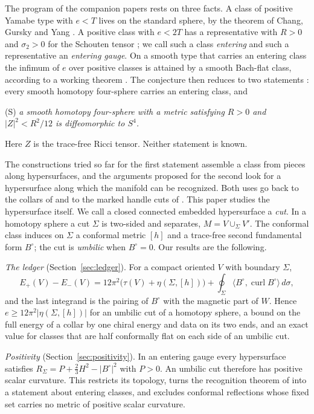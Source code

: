 \documentclass[11pt,letterpaper]{article}
\numberwithin{equation}{section}
\theoremstyle{definition}
\DeclareMathOperator{\curl}{curl}
\begin{document}
The program of the companion papers \cite{Baker2026ChiralMaster} rests on
three facts. A class of positive Yamabe type with \(e<T\) lives on the
standard sphere, by the theorem of Chang, Gursky and Yang
\cite{ChangGurskyYang2003}. A positive class with \(e<2T\) has a
representative with \(R>0\) and \(\sigma_2>0\) for the Schouten tensor
\cite{ChangGurskyYang2002PositiveRicci}; we call such a class
\emph{entering} and such a representative an \emph{entering gauge}. On a
smooth type that carries an entering class the infimum of \(e\) over
positive classes is attained by a smooth Bach-flat class, according to a
working theorem \cite{Baker2026BourAttainment}. The conjecture then
reduces to two statements \cite{Baker2026ChiralMaster}: every smooth
homotopy four-sphere carries an entering class, and

\medskip
\noindent\textup{(S)}\quad
\emph{a smooth homotopy four-sphere with a metric satisfying \(R>0\) and
\(|Z|^2<R^2/12\) is diffeomorphic to \(S^4\).}
\medskip

\noindent
Here \(Z\) is the trace-free Ricci tensor. Neither statement is known.

The constructions tried so far for the first statement assemble a class
from pieces along hypersurfaces, and the arguments proposed for the second
look for a hypersurface along which the manifold can be recognized. Both
uses go back to the collars of \cite{Baker2026CollarProgram} and to the
marked handle cuts of \cite{Baker2026HandleCuts}. This paper studies the
hypersurface itself. We call a closed connected embedded hypersurface a
\emph{cut}. In a homotopy sphere a cut \(\Sigma\) is two-sided and
separates, \(M=V\cup_\Sigma V'\). The conformal class induces on
\(\Sigma\) a conformal metric \([h]\) and a trace-free second fundamental
form \(B^\circ\); the cut is \emph{umbilic} when \(B^\circ=0\).
Our results are the following.

\emph{The ledger} (Section~\ref{sec:ledger}). For a compact oriented
\(V\) with boundary \(\Sigma\),
\[
 E_+(V)-E_-(V)=12\pi^2\bigl(\tau(V)+\eta(\Sigma,[h])\bigr)
 +\oint_\Sigma\langle B^\circ,\curl B^\circ\rangle\,d\sigma ,
\]
and the last integrand is the pairing of \(B^\circ\) with the
magnetic part of \(W\). Hence \(e\ge12\pi^2|\eta(\Sigma,[h])|\) for an
umbilic cut of a homotopy sphere, a bound on the full energy of a collar
by one chiral energy and data on its two ends, and an exact value for
classes that are half conformally flat on each side of an umbilic cut.

\emph{Positivity} (Section~\ref{sec:positivity}). In an entering gauge
every hypersurface satisfies \(R_\Sigma=P+\tfrac23H^2-|B^\circ|^2\) with
\(P>0\). An umbilic cut therefore has positive scalar curvature. This
restricts its topology, turns the recognition theorem of
\cite{Baker2026HandleCuts} into a statement about entering classes, and
excludes conformal reflections whose fixed set carries no metric of
positive scalar curvature.
\end{document}
